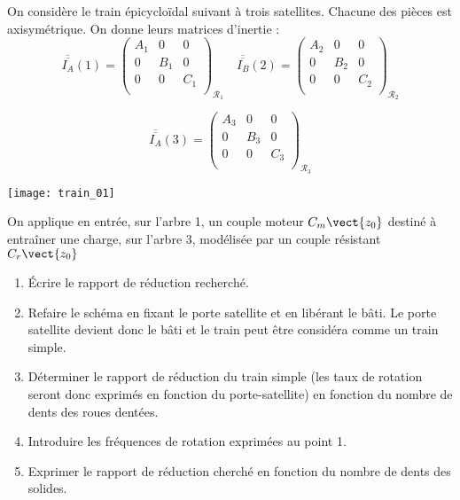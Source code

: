 \begin{multicols}{2}
On considère le train épicycloïdal suivant à trois satellites. Chacune des pièces est axisymétrique. On donne leurs matrices d'inertie :
$$
\overline{\overline{I_A}}(1) = 
\begin{pmatrix} 
A_1 & 0 & 0 \\
0 & B_1 & 0 \\
0 & 0 & C_1 \\
\end{pmatrix}_{\mathcal{R}_1}
\quad
\overline{\overline{I_B}}(2) = 
\begin{pmatrix} 
A_2 & 0 & 0 \\
0 & B_2 & 0 \\
0 & 0 & C_2 \\
\end{pmatrix}_{\mathcal{R}_2}
$$

$$
\overline{\overline{I_A}}(3) = 
\begin{pmatrix} 
A_3 & 0 & 0 \\
0 & B_3 & 0 \\
0 & 0 & C_3 \\
\end{pmatrix}_{\mathcal{R}_3}
$$

\begin{center}
\texttt{[image: train\_01]}
\end{center}

On applique en entrée, sur l'arbre 1, un couple moteur $C_m\vect{z_0}$ destiné à entraîner une charge, sur l'arbre 3, modélisée par un couple résistant  $C_r\vect{z_0}$

\ifprof
\begin{corrige}
\begin{methode}
\begin{enumerate}
\item Écrire le rapport de réduction recherché.
\item Refaire le schéma en fixant le porte satellite et en libérant le bâti. Le porte satellite devient donc le bâti et le train peut être considéra comme un train simple.
\item Déterminer le rapport de réduction du train simple (les taux de rotation seront donc exprimés en fonction du porte-satellite) en fonction du nombre de dents des roues dentées.
\item Introduire les fréquences de rotation exprimées au point 1.
\item Exprimer le rapport de réduction cherché en fonction du  nombre de dents des solides. 
\end{enumerate}
\end{methode}



\end{corrige}
\end{multicols}
